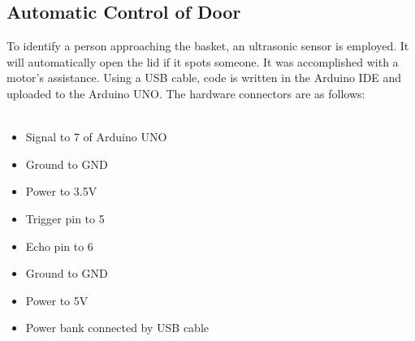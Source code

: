 \subsection{Automatic Control of Door}
\par To identify a person approaching the basket, an ultrasonic sensor is employed. It will automatically open the lid if it spots someone. It was accomplished with a motor's assistance.
Using a USB cable, code is written in the Arduino IDE and uploaded to the Arduino UNO. The hardware connectors are as follows:
\\\\
    \begin{itemize}
        \item Signal to 7 of Arduino UNO
        \item Ground to GND
        \item Power to 3.5V
    \end{itemize}
    \begin{itemize}
        \item Trigger pin to 5
        \item Echo pin to 6
        \item Ground to GND
        \item Power to 5V
    \end{itemize}
\begin{itemize}
    \item Power bank connected by USB cable
\end{itemize}



















